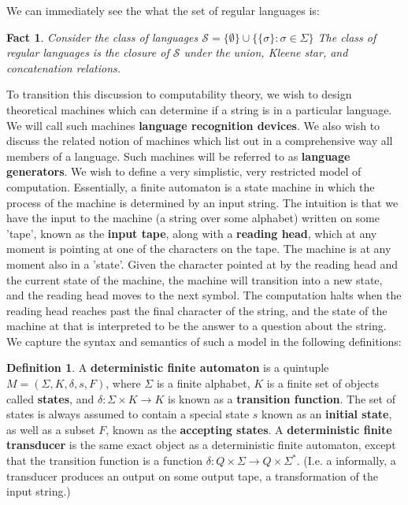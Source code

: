 \documentclass{article}
\theoremstyle{definition}
\newtheorem{definition}{Definition}[section]
\theoremstyle{plain}
\theoremstyle{theorem}
\newtheorem{fact}{Fact}[section]
\begin{document}
We can immediately see the what the set of regular languages is:
\begin{fact}
	Consider the class of languages $\mathcal{S} = \{\emptyset\} \cup \{\{\sigma\}: \sigma \in \Sigma\}$ The class of regular languages is the closure of $\mathcal{S}$ under the union, Kleene star, and concatenation relations. 
\end{fact}
To transition this discussion to computability theory, we wish to design theoretical machines which can determine if a string is in a particular language. We will call such machines \textbf{language recognition devices}. We also wish to discuss the related notion of machines which list out in a comprehensive way all members of a language. Such machines will be referred to as \textbf{language generators}.
	We wish to define a very simplistic, very restricted model of computation. Essentially, a finite automaton is a state machine in which the process of the machine is determined by an input string. The intuition is that we have the input to the machine (a string over some alphabet) written on some 'tape', known as the \textbf{input tape}, along with a \textbf{reading head}, which at any moment is pointing at one of the characters on the tape. The machine is at any moment also in a 'state'. Given the character pointed at by the reading head and the current state of the machine, the machine will transition into a new state, and the reading head moves to the next symbol. The computation halts when the reading head reaches past the final character of the string, and the state of the machine at that is interpreted to be the answer to a question about the string. We capture the syntax and semantics of such a model in the following definitions:
\begin{definition}
	A \textbf{deterministic finite automaton} is a quintuple $M = (\Sigma,K,\delta,s,F)$, where $\Sigma$ is a finite alphabet, $K$ is a finite set of objects called \textbf{states}, and $\delta: \Sigma \times K \to K$ is known as a \textbf{transition function}. The set of states is always assumed to contain a special state $s$ known as an \textbf{initial state}, as well as a subset $F$, known as the \textbf{accepting states}. A \textbf{deterministic finite transducer} is the same exact object as a deterministic finite automaton, except that the transition function is a function $\delta: Q \times \Sigma \to Q \times \Sigma^*$. (I.e. a informally, a transducer produces an output on some output tape, a transformation of the input string.)
\end{definition}
\end{document}
